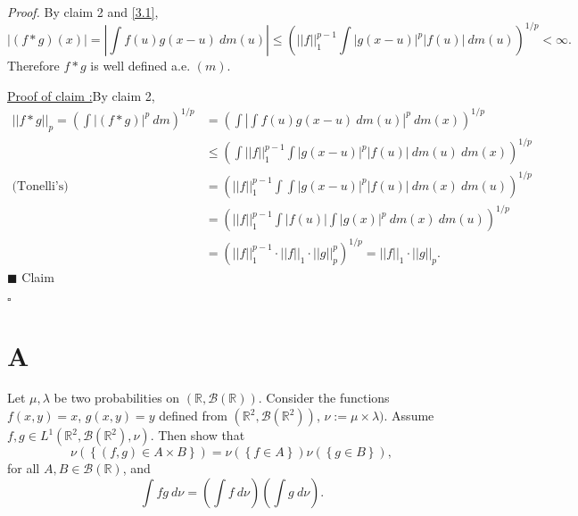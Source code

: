 \documentclass[12pt]{article}
\newcounter{ProofCounter}
\newcounter{ClaimCounter}[ProofCounter]
\newenvironment{Proof}{\stepcounter{ProofCounter}\textit{Proof.}}{\hfill$\square$}
\newenvironment{claim}[1]{\vspace{3mm}\stepcounter{ClaimCounter}\par\noindent\underline{\bf Claim \theClaimCounter:}\space#1}{}
\newenvironment{claimproof}[1]{\par\noindent\underline{Proof of claim \theClaimCounter:}\space#1}{\hfill $\blacksquare$ Claim \theClaimCounter}
\begin{document}
\begin{Proof}
By claim 2 and \eqref{3.1},
\[ |(f*g)(x)| = \left| \int f(u)g(x-u)\ dm(u)\right| \leq \left( ||f||_{1}^{p-1}\int |g(x-u)|^{p}|f(u)|\ dm(u) \right)^{1/p} < \infty. \]
Therefore $f*g$ is well defined a.e. $(m)$.

\begin{claimproof}
By claim 2,
\begin{align*}
||f*g||_{p} = \left( \int |(f*g)|^{p}\ dm \right)^{1/p} & = \left( \int \left| \int f(u)g(x-u)\ dm(u)\right|^{p}\ dm(x) \right)^{1/p} \\
& \leq \left( \int ||f||_{1}^{p-1}\int |g(x-u)|^{p}|f(u)|\ dm(u)\ dm(x) \right)^{1/p} \\
\text{(Tonelli's) } & = \left( ||f||_{1}^{p-1}\int\int |g(x-u)|^{p}|f(u)|\ dm(x)\ dm(u) \right)^{1/p} \\
& = \left( ||f||_{1}^{p-1}\int |f(u)|\int |g(x)|^{p}\ dm(x)\ dm(u) \right)^{1/p} \\
& = \left( ||f||_{1}^{p-1}\cdot ||f||_{1}\cdot ||g||_{p}^{p} \right)^{1/p} = ||f||_{1}\cdot ||g||_{p}.
\end{align*}
\end{claimproof}

\end{Proof}











\newpage 
\section*{A}
Let $\mu, \lambda$ be two probabilities on $(\mathbb{R}, \mathcal{B}(\mathbb{R}))$. Consider the functions $f(x,y) = x$, $g(x,y) = y$ defined from
$(\mathbb{R}^{2}, \mathcal{B}(\mathbb{R}^{2}))$, $\nu := \mu \times \lambda)$. Assume $f,g \in L^{1}(\mathbb{R}^{2}, \mathcal{B}(\mathbb{R}^{2}),
\nu)$. Then show that 
\[ \nu\left( \left\{ (f,g) \in A\times B \right\} \right) = \nu\left( \left\{ f\in A \right\} \right)\nu\left( \left\{ g \in B \right\} \right), \]
for all $A,B \in \mathcal{B}(\mathbb{R})$, and 
\[ \int fg\  d\nu = \left( \int f\ d\nu \right)\left( \int g\ d\nu \right). \]
\end{document}
